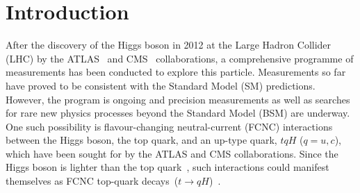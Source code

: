 \section{Introduction}
\label{sec:intro}
After the discovery of the Higgs boson in 2012 at the Large Hadron Collider (LHC) by the ATLAS~\cite{Aad:2012tfa} and 
CMS~\cite{Chatrchyan:2012ufa} collaborations, 
a comprehensive programme of measurements %
has been conducted to explore this particle. Measurements so far have proved to be consistent with the Standard Model (SM) predictions. 
However, the program is ongoing and precision measurements as well as searches for rare new physics processes beyond the Standard Model (BSM)
are underway. One such possibility is flavour-changing neutral-current (FCNC) interactions between the Higgs boson, 
the top quark, and an up-type quark, $tqH$ ($q=u, c$), which have been sought for by the ATLAS and CMS collaborations.  
Since the Higgs boson is lighter than the top quark~\cite{Aad:2015zhl},
such interactions could manifest themselves as FCNC top-quark decays~($t\to qH$)~\cite{Agashe:2013hma}.

